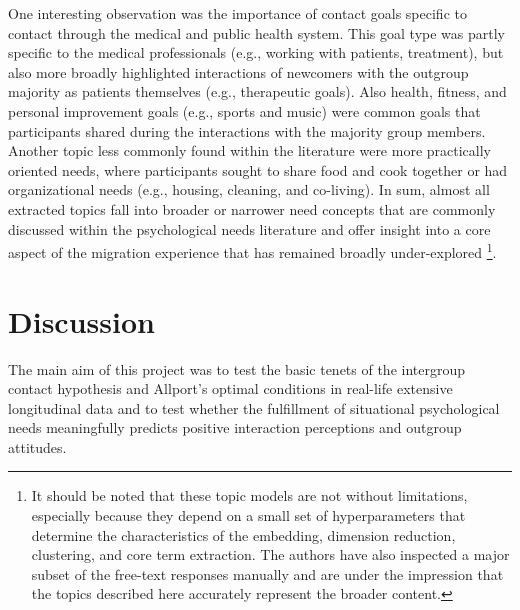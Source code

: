 \documentclass[man, 12pt, a4paper, mask]{apa7}
\theoremstyle{break}
\theoremstyle{plain}
\begin{document}
One interesting observation was the importance of contact goals specific
to contact through the medical and public health system. This goal type
was partly specific to the medical professionals (e.g., working with
patients, treatment), but also more broadly highlighted interactions of
newcomers with the outgroup majority as patients themselves (e.g.,
therapeutic goals). Also health, fitness, and personal improvement goals
(e.g., sports and music) were common goals that participants shared
during the interactions with the majority group members. Another topic
less commonly found within the literature were more practically oriented
needs, where participants sought to share food and cook together or had
organizational needs (e.g., housing, cleaning, and co-living). In sum,
almost all extracted topics fall into broader or narrower need concepts
that are commonly discussed within the psychological needs literature
\citep[e.g.,][]{Orehek2018a} and offer insight into a core aspect of the
migration experience that has remained broadly under-explored
\citep[][]{Kreienkamp2022d}\footnote{It should be noted that these topic models are not without limitations, especially because they depend on a small set of hyperparameters that determine the characteristics of the embedding, dimension reduction, clustering, and core term extraction. The authors have also inspected a major subset of the free-text responses manually and are under the impression that the topics described here accurately represent the broader content.}.


\section{Discussion}
The main aim of this project was to test the basic tenets of the intergroup contact hypothesis and Allport's optimal conditions in real-life extensive longitudinal data and to test whether the fulfillment of situational psychological needs meaningfully predicts positive interaction perceptions and outgroup attitudes. 
\end{document}

